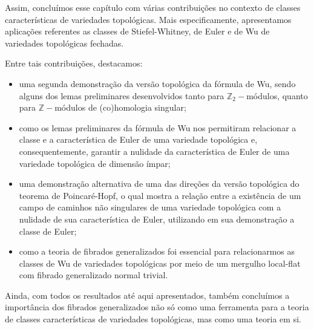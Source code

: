 \documentclass[12pt,oneside]{book} %
\newcommand{\Z}{\mathbb{Z}}
\begin{document}
\par Assim, concluímos esse capítulo com várias contribuições no contexto de classes características de variedades topológicas. Mais especificamente, apresentamos aplicações referentes as classes de Stiefel-Whitney, de Euler e de Wu de variedades topológicas fechadas.

\par Entre tais contribuições, destacamos:

	\begin{itemize}
		\item uma segunda demonstração da versão topológica da fórmula de Wu, sendo alguns dos lemas preliminares desenvolvidos tanto para $\Z_{2}-$módulos, quanto para $\Z-$módulos de (co)homologia singular;
		\item como os lemas preliminares da fórmula de Wu nos permitiram relacionar a classe e a característica de Euler de uma variedade topológica e, consequentemente, garantir a nulidade da característica de Euler de uma variedade topológica de dimensão ímpar;
		\item uma demonstração alternativa de uma das direções da versão topológica do teorema de Poincaré-Hopf, o qual mostra a relação entre a existência de um campo de caminhos não singulares de uma variedade topológica com a nulidade de sua característica de Euler, utilizando em sua demonstração a classe de Euler;
		\item como a teoria de fibrados generalizados foi essencial para relacionarmos as classes de Wu de variedades topológicas por meio de um mergulho local-flat com fibrado generalizado normal trivial.
	\end{itemize}

\par Ainda, com todos os resultados até aqui apresentados, também concluímos a importância dos fibrados generalizados não só como uma ferramenta para a teoria de classes características de variedades topológicas, mas como uma teoria em si.





\end{document}
